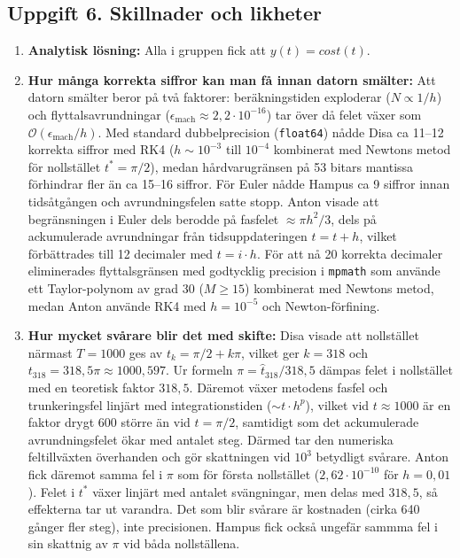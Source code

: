 \documentclass{article}
\begin{document}
\subsection*{Uppgift 6. Skillnader och likheter}

\begin{enumerate}
    \item \textbf{Analytisk lösning:} Alla i gruppen fick att $y(t)=cost(t)$.
    \item \textbf{Hur många korrekta siffror kan man få innan datorn smälter:} 
    Att datorn smälter beror på två faktorer: beräkningstiden exploderar ($N \propto 1/h$) och flyttalsavrundningar ($\epsilon_{\text{mach}} \approx 2{,}2 \cdot 10^{-16}$) tar över då felet växer som $\mathcal{O}(\epsilon_{\text{mach}}/h)$. Med standard dubbelprecision (\texttt{float64}) nådde Disa ca 11–12 korrekta siffror med RK4 ($h \sim 10^{-3}$ till $10^{-4}$ kombinerat med Newtons metod för nollstället $t^* = \pi/2$), medan hårdvarugränsen på 53 bitars mantissa förhindrar fler än ca 15–16 siffror. För Euler nådde Hampus ca 9 siffror innan tidsåtgången och avrundningsfelen satte stopp. Anton visade att begränsningen i Euler dels berodde på fasfelet $\approx \pi h^2/3$, dels på ackumulerade avrundningar från tidsuppdateringen $t = t + h$, vilket förbättrades till 12 decimaler med $t = i \cdot h$. För att nå 20 korrekta decimaler eliminerades flyttalsgränsen med godtycklig precision i \texttt{mpmath} som använde ett Taylor-polynom av grad 30 ($M \ge 15$) kombinerat med Newtons metod, medan Anton använde RK4 med $h = 10^{-5}$ och Newton-förfining.
    \item \textbf{Hur mycket svårare blir det med skifte:} 
    Disa visade att nollstället närmast $T = 1000$ ges av $t_k = \pi/2 + k\pi$, vilket ger $k = 318$ och $t_{318} = 318{,}5\pi \approx 1000{,}597$. Ur formeln $\pi = \hat{t}_{318}/318{,}5$ dämpas felet i nollstället med en teoretisk faktor $318{,}5$. Däremot växer metodens fasfel och trunkeringsfel linjärt med integrationstiden ($\sim t \cdot h^p$), vilket vid $t \approx 1000$ är en faktor drygt 600 större än vid $t = \pi/2$, samtidigt som det ackumulerade avrundningsfelet ökar med antalet steg. Därmed tar den numeriska feltillväxten överhanden och gör skattningen vid $10^3$ betydligt svårare. Anton fick däremot samma fel i $\pi$ som för första nollstället ($2{,}62 \cdot 10^{-10}$ för $h = 0{,}01$). Felet i $t^*$ växer linjärt med antalet svängningar, men delas med $318{,}5$, så effekterna tar ut varandra. Det som blir svårare är kostnaden (cirka 640 gånger fler steg), inte precisionen. Hampus fick också ungefär sammma fel i sin skattnig av $\pi$ vid båda nollställena.
\end{enumerate}
\end{document}
